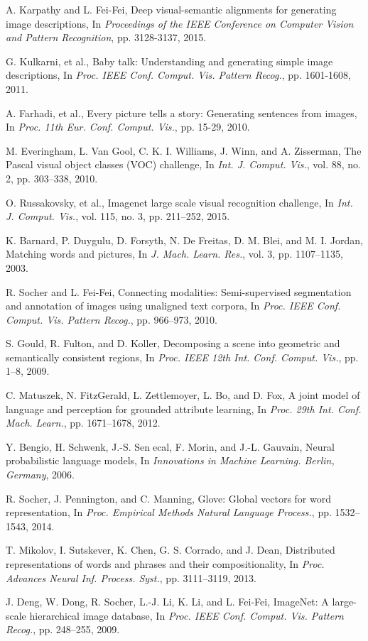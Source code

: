 \documentclass[10pt,twocolumn,letterpaper]{article}
\begin{document}
\begin{thebibliography}{99}
A. Karpathy and L. Fei-Fei, Deep visual-semantic alignments for generating image descriptions,
In \textit{Proceedings of the IEEE Conference on Computer Vision and Pattern Recognition}, pp. 3128-3137, 2015.

G. Kulkarni, et al., Baby talk: Understanding and generating simple image descriptions,
In \textit{Proc. IEEE Conf. Comput. Vis. Pattern Recog.}, pp. 1601-1608, 2011.

A. Farhadi, et al., Every picture tells a story: Generating sentences from images,
In \textit{Proc. 11th Eur. Conf. Comput. Vis.}, pp. 15-29, 2010.

M. Everingham, L. Van Gool, C. K. I. Williams, J. Winn, and A. Zisserman, The Pascal visual object classes (VOC) challenge,
In \textit{Int. J. Comput. Vis.}, vol. 88, no. 2, pp. 303–338, 2010.

O. Russakovsky, et al., Imagenet large scale visual recognition challenge,
In \textit{Int. J. Comput. Vis.}, vol. 115, no. 3, pp. 211–252, 2015.

K. Barnard, P. Duygulu, D. Forsyth, N. De Freitas, D. M. Blei, and M. I. Jordan, Matching words and pictures,
In \textit{J. Mach. Learn. Res.}, vol. 3, pp. 1107–1135, 2003.

R. Socher and L. Fei-Fei, Connecting modalities: Semi-supervised segmentation and annotation of images using unaligned text corpora,
In \textit{Proc. IEEE Conf. Comput. Vis. Pattern Recog.}, pp. 966–973, 2010.

S. Gould, R. Fulton, and D. Koller, Decomposing a scene into geometric and semantically consistent regions,
In \textit{Proc. IEEE 12th Int. Conf. Comput. Vis.}, pp. 1–8, 2009.

C. Matuszek, N. FitzGerald, L. Zettlemoyer, L. Bo, and D. Fox, A joint model of language and perception for grounded attribute learning,
In \textit{Proc. 29th Int. Conf. Mach. Learn.}, pp. 1671–1678, 2012.

Y. Bengio, H. Schwenk, J.-S. Senecal, F. Morin, and J.-L. Gauvain, Neural probabilistic language models,
In \textit{Innovations in Machine Learning. Berlin, Germany}, 2006.

R. Socher, J. Pennington, and C. Manning, Glove: Global vectors for word representation,
In \textit{Proc. Empirical Methods Natural Language Process.}, pp. 1532–1543, 2014.

T. Mikolov, I. Sutskever, K. Chen, G. S. Corrado, and J. Dean, Distributed representations of words and phrases and their compositionality,
In \textit{Proc. Advances Neural Inf. Process. Syst.}, pp. 3111–3119, 2013.

J. Deng, W. Dong, R. Socher, L.-J. Li, K. Li, and L. Fei-Fei, ImageNet: A large-scale hierarchical image database,
In \textit{Proc. IEEE Conf. Comput. Vis. Pattern Recog.}, pp. 248–255, 2009.

\end{thebibliography}
\end{document}
